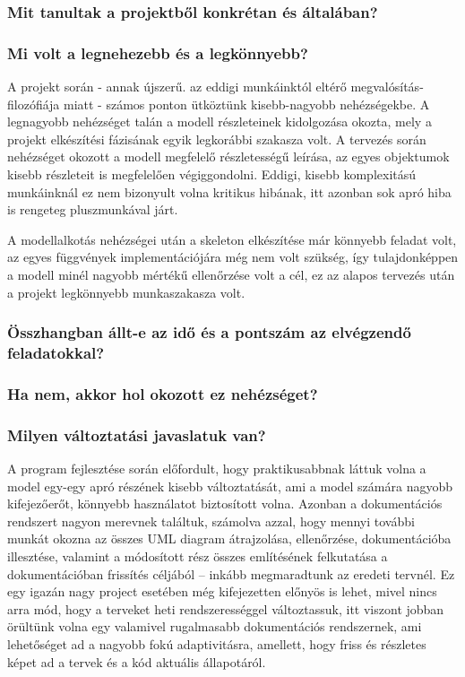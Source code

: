 		\subsubsection*{Mit tanultak a projektből konkrétan és általában?}
		
		\subsubsection*{Mi volt a legnehezebb és a legkönnyebb?}
A projekt során - annak újszerű. az eddigi munkáinktól eltérő megvalósítás-filozófiája miatt - számos ponton ütköztünk kisebb-nagyobb nehézségekbe. A legnagyobb nehézséget talán a modell részleteinek kidolgozása okozta, mely a projekt elkészítési fázisának egyik legkorábbi szakasza volt. A tervezés során nehézséget okozott a modell megfelelő részletességű leírása, az egyes objektumok kisebb részleteit is megfelelően végiggondolni. Eddigi, kisebb komplexitású munkáinknál ez nem bizonyult volna kritikus hibának, itt azonban sok apró hiba is rengeteg pluszmunkával járt.

A modellalkotás nehézségei után a skeleton elkészítése már könnyebb feladat volt, az egyes függvények implementációjára még nem volt szükség, így tulajdonképpen a modell minél nagyobb mértékű ellenőrzése volt a cél, ez az alapos tervezés után a projekt legkönnyebb munkaszakasza volt.
		
		\subsubsection*{Összhangban állt-e az idő és a pontszám az elvégzendő feladatokkal?}
		
		\subsubsection*{Ha nem, akkor hol okozott ez nehézséget?}
		
		\subsubsection*{Milyen változtatási javaslatuk van?}
		A program fejlesztése során előfordult, hogy praktikusabbnak láttuk volna a model egy-egy apró részének kisebb változtatását, ami a model számára nagyobb kifejezőerőt, könnyebb használatot biztosított volna. Azonban a dokumentációs rendszert nagyon merevnek találtuk, számolva azzal, hogy mennyi további munkát okozna az összes UML diagram átrajzolása, ellenőrzése, dokumentációba illesztése, valamint a módosított rész összes említésének felkutatása a dokumentációban frissítés céljából -- inkább megmaradtunk az eredeti tervnél. Ez egy igazán nagy project esetében még kifejezetten előnyös is lehet, mivel nincs arra mód, hogy a terveket heti rendszerességgel változtassuk, itt viszont jobban örültünk volna egy valamivel rugalmasabb dokumentációs rendszernek, ami lehetőséget ad a nagyobb fokú adaptivitásra, amellett, hogy friss és részletes képet ad a tervek és a kód aktuális állapotáról.
		
